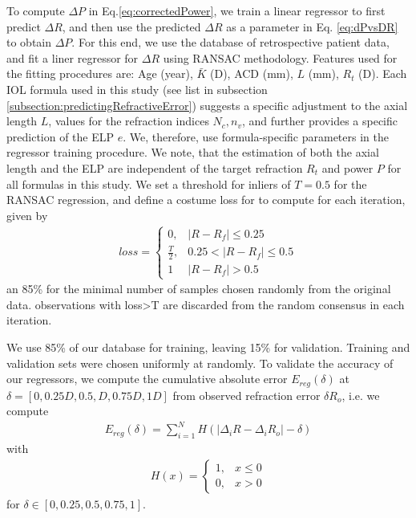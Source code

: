 \documentclass[article,twocolumn,preprint,10pt]{paper}%
\renewcommand{\(}{\left(}
\renewcommand{\)}{\right)}
\renewcommand{\[}{\left[}
\renewcommand{\]}{\right]}
\newcommand{\beq}{\begin{eqnarray}}
\newcommand{\eeq}{\end{eqnarray}}
\newcommand{\1}{\mbox{\boldmath$1$}}
\begin{document}
To compute $\Delta P$ in Eq.\ref{eq:correctedPower}, we train a linear regressor to first predict $\Delta R$, and  then use the predicted $\Delta R$ as a parameter in Eq. \ref{eq:dPvsDR} to obtain $\Delta P$. 
For this end,  we use the database of retrospective patient data,  and fit a liner regressor for $\Delta R$ using RANSAC methodology. Features used for the fitting procedures are: Age (year), $\bar{K}$ (D), ACD (mm), $L$ (mm), $R_t$ (D).
Each IOL formula used in this study (see list in subsection \ref{subsection:predictingRefractiveError}) suggests a specific adjustment to the axial length $L$, values for the refraction indices $N_c, n_v$, and further provides a specific prediction of the ELP $e$. We, therefore, use formula-specific parameters in the regressor training procedure. We note, that the estimation of both the axial length and the ELP are independent of the target refraction $R_t$ and power $P$ for all formulas in this study. 
We set a threshold for inliers of $T=0.5$ for the RANSAC regression, and define a costume loss for to compute for each iteration, given by 
\beq 
loss = \begin{cases}
	0, &|R-R_f|\leq 0.25\\
	\frac{T}{2}, & 0.25<|R-R_f|\leq 0.5\\
	1 & |R-R_f|>0.5
\end{cases}
\eeq 
an 85\% for the minimal number of samples chosen randomly from the original data. 
observations with loss>T are discarded from the random consensus in each iteration.
 
We  use 85\% of our database for training, leaving 15\% for validation. Training and validation sets were chosen uniformly at randomly. To validate the accuracy of our regressors, we compute the cumulative absolute error $E_{reg}(\delta)$ at $\delta =[0, 0.25D, 0.5,D, 0.75D, 1D]$ from observed refraction error $\delta R_o$, i.e. we compute 
\beq \label{eq:regressionCumError}
E_{reg}(\delta) = \sum_{i=1}^NH(|\Delta_i R -\Delta_i R_o|- \delta )
\eeq 
with 
\beq \label{eq:Hfunction}
H(x)=\begin{cases}
	1, & x\leq 0\\
	0, & x>0
\end{cases}
\eeq 
for $\delta\in [0,0.25, 0.5, 0.75,1]$.
\end{document}
